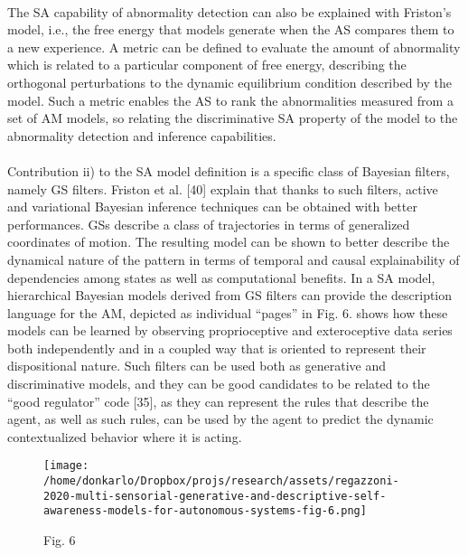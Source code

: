 \documentclass{article}
\begin{document}
		\paragraph{} The SA capability of abnormality detection can also be explained with Friston’s model, i.e., the free energy that
		models generate when the AS compares them to a new experience. A metric can be defined to evaluate the amount
		of abnormality which is related to a particular component
		of free energy, describing the orthogonal perturbations to the
		dynamic equilibrium condition described by the model. Such
		a metric enables the AS to rank the abnormalities measured
		from a set of AM models, so relating the discriminative
		SA property of the model to the abnormality detection and
		inference capabilities.
		\paragraph{}Contribution ii) to the SA model definition is a specific class
		of Bayesian filters, namely GS filters. Friston et al. [40] explain
		that thanks to such filters, active and variational Bayesian
		inference techniques can be obtained with better performances.
		GSs describe a class of trajectories in terms of generalized
		coordinates of motion. The resulting model can be shown to
		better describe the dynamical nature of the pattern in terms
		of temporal and causal explainability of dependencies among
		states as well as computational benefits. In a SA model,
		hierarchical Bayesian models derived from GS filters can
		provide the description language for the AM, depicted as
		individual “pages” in Fig. 6. \citet{regazzoni-2020-multi-sensorial-generative-and-descriptive-self-awareness-models-for-autonomous-systems} shows how these models
		can be learned by observing proprioceptive and exteroceptive
		data series both independently and in a coupled way that is
		oriented to represent their dispositional nature. Such filters can
		be used both as generative and discriminative models, and they
		can be good candidates to be related to the “good regulator”
		code [35], as they can represent the rules that describe the
		agent, as well as such rules, can be used by the agent to predict
		the dynamic contextualized behavior where it is acting.
		\begin{figure*}
			\centering
			\texttt{[image: /home/donkarlo/Dropbox/projs/research/assets/regazzoni-2020-multi-sensorial-generative-and-descriptive-self-awareness-models-for-autonomous-systems-fig-6.png]}
			\caption{\citet{regazzoni-2020-multi-sensorial-generative-and-descriptive-self-awareness-models-for-autonomous-systems} Fig. 6}
			\label{fig:regazzoni-2020-multi-sensorial-generative-and-descriptive-self-awareness-models-for-autonomous-systems-fig-6.png}
		\end{figure*}
\end{document}
